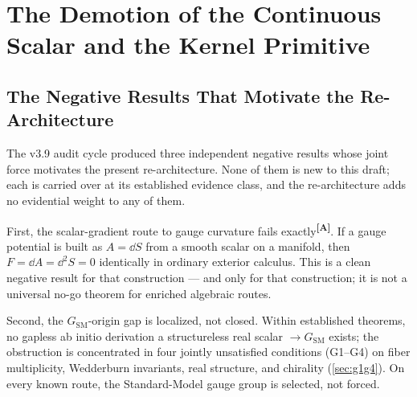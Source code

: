 \documentclass[12pt,a4paper,twoside]{article}
\theoremstyle{plain}
\theoremstyle{definition}
\theoremstyle{remark}
\newcommand{\catmark}[1]{\textsuperscript{\textsf{\textbf{[#1]}}}}
\begin{document}

\section{The Demotion of the Continuous Scalar and the Kernel Primitive}
\label{sec:demotion}

\subsection{The Negative Results That Motivate the Re-Architecture}
\label{subsec:negative-results}

The v3.9 audit cycle produced three independent negative results whose
joint force motivates the present re-architecture. None of them is new to
this draft; each is carried over at its established evidence class, and the
re-architecture adds no evidential weight to any of them.

First, the scalar-gradient route to gauge curvature fails
exactly\catmark{A}. If a gauge potential is built as $A = \dd S$ from a
smooth scalar on a manifold, then $F = \dd A = \dd^2 S = 0$ identically in
ordinary exterior calculus. This is a clean negative result for that
construction --- and only for that construction; it is not a universal
no-go theorem for enriched algebraic routes.

Second, the $G_{\mathrm{SM}}$-origin gap is localized, not closed. Within
established theorems, no gapless ab initio derivation
a structureless real scalar $\to G_{\mathrm{SM}}$ exists; the obstruction is concentrated in four
jointly unsatisfied conditions (G1--G4) on fiber multiplicity, Wedderburn
invariants, real structure, and chirality
(\cref{sec:g1g4}). On every known route, the Standard-Model gauge group is
selected, not forced.
\end{document}
